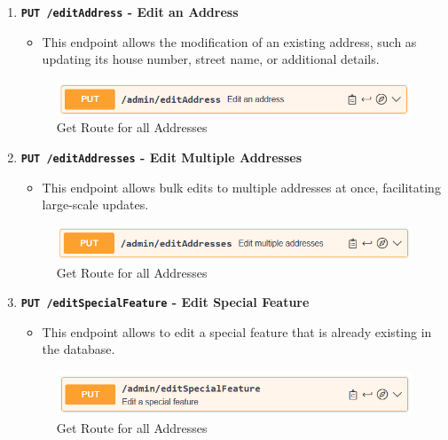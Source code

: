 \begin{enumerate}
        \item \textbf{\texttt{PUT /editAddress} - Edit an Address}
        \begin{itemize}
            \item This endpoint allows the modification of an existing address, such as updating its house number, street name, or additional details.
        \end{itemize} 
        \begin{figure} [H]
            \centering
            \includegraphics [width=1\textwidth] {images/andreas/praxis/editAddress.png}
            \caption{Get Route for all Addresses}
        \end{figure}

        \item \textbf{\texttt{PUT /editAddresses} - Edit Multiple Addresses}
        \begin{itemize}
            \item This endpoint allows bulk edits to multiple addresses at once, facilitating large-scale updates.
        \end{itemize} 
        \begin{figure} [H]
            \centering
            \includegraphics [width=1\textwidth] {images/andreas/praxis/editAddresses.png}
            \caption{Get Route for all Addresses}
        \end{figure}

        \item \textbf{\texttt{PUT /editSpecialFeature} - Edit Special Feature}
        \begin{itemize}
            \item This endpoint allows to edit a special feature that is already existing in the database.
        \end{itemize} 
        \begin{figure} [H]
            \centering
            \includegraphics [width=1\textwidth] {images/andreas/praxis/editSF.png}
            \caption{Get Route for all Addresses}
        \end{figure}
    \end{enumerate}

